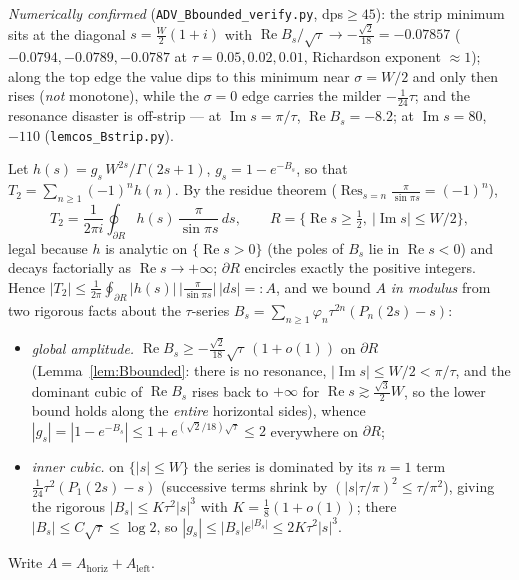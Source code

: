 \noindent\emph{Numerically confirmed} (\texttt{ADV\_Bbounded\_verify.py}, dps$\ge45$): the strip minimum
sits at the diagonal $s=\tfrac W2(1+i)$ with $\operatorname{Re}B_s/\sqrt\tau\to-\tfrac{\sqrt2}{18}=-0.07857$
($-0.0794,-0.0789,-0.0787$ at $\tau=0.05,0.02,0.01$, Richardson exponent $\approx1$); along the top edge the
value dips to this minimum near $\sigma=W/2$ and only then rises (\emph{not} monotone), while the $\sigma=0$
edge carries the milder $-\tfrac1{24}\tau$; and the resonance disaster is off-strip --- at
$\operatorname{Im}s=\pi/\tau$, $\operatorname{Re}B_s=-8.2$; at $\operatorname{Im}s=80$, $-110$
(\texttt{lemcos\_Bstrip.py}).

\begin{lemma}[Absolute contour bound: $|T_2|=O(\tau^{1/4})\to0$, no oscillatory cancellation]\label{lem:T2abs}
Let $h(s)=g_s\,W^{2s}/\Gamma(2s+1)$, $g_s=1-e^{-B_s}$, so that $T_2=\sum_{n\ge1}(-1)^n h(n)$. By the residue
theorem \textup($\operatorname{Res}_{s=n}\tfrac{\pi}{\sin\pi s}=(-1)^n$\textup),
\[
   T_2=\frac{1}{2\pi i}\oint_{\partial R}h(s)\,\frac{\pi}{\sin\pi s}\,ds,\qquad
   R=\bigl\{\operatorname{Re}s\ge\tfrac12,\ |\operatorname{Im}s|\le W/2\bigr\},
\]
legal because $h$ is analytic on $\{\operatorname{Re}s>0\}$ \textup(the poles of $B_s$ lie in
$\operatorname{Re}s<0$\textup) and decays factorially as $\operatorname{Re}s\to+\infty$; $\partial R$ encircles
exactly the positive integers. Hence
$|T_2|\le\frac1{2\pi}\oint_{\partial R}|h(s)|\,\bigl|\tfrac\pi{\sin\pi s}\bigr|\,|ds|=:A$, and we bound $A$
\emph{in modulus} from two rigorous facts about the $\tau$-series $B_s=\sum_{n\ge1}\varphi_n\tau^{2n}(P_n(2s)-s)$:
\begin{itemize}[leftmargin=1.7em,itemsep=0.1em]
\item[\textup{(i)}] \emph{global amplitude.} $\operatorname{Re}B_s\ge-\tfrac{\sqrt2}{18}\sqrt\tau\,(1+o(1))$ on
$\partial R$ \textup(Lemma~\ref{lem:Bbounded}: there is no resonance, $|\operatorname{Im}s|\le W/2<\pi/\tau$, and
the dominant cubic of $\operatorname{Re}B_s$ rises back to $+\infty$ for $\operatorname{Re}s\gtrsim\tfrac{\sqrt3}2W$,
so the lower bound holds along the \emph{entire} horizontal sides\textup), whence
$|g_s|=|1-e^{-B_s}|\le1+e^{(\sqrt2/18)\sqrt\tau}\le2$ everywhere on $\partial R$;
\item[\textup{(ii)}] \emph{inner cubic.} on $\{|s|\le W\}$ the series is dominated by its $n=1$ term
$\tfrac1{24}\tau^2(P_1(2s)-s)$ (successive terms shrink by $(|s|\tau/\pi)^2\le\tau/\pi^2$), giving the rigorous
$|B_s|\le K\tau^2|s|^3$ with $K=\tfrac18(1+o(1))$; there $|B_s|\le C\sqrt\tau\le\log2$, so
$|g_s|\le|B_s|e^{|B_s|}\le2K\tau^2|s|^3$.
\end{itemize}
Write $A=A_{\mathrm{horiz}}+A_{\mathrm{left}}$.


\end{lemma}
